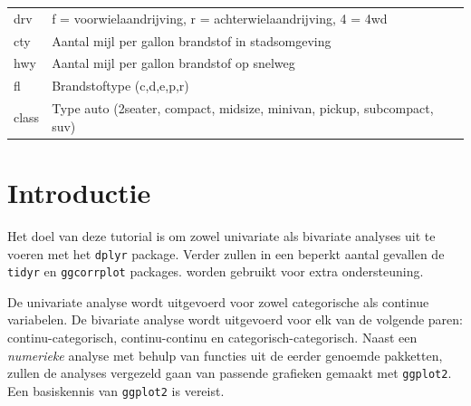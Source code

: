 \documentclass[]{tufte-book}
\begin{document}
\begin{longtable}[]{@{}ll@{}}
\begin{minipage}[t]{0.35\columnwidth}
drv\strut
\end{minipage} & \begin{minipage}[t]{0.59\columnwidth}\raggedright
f = voorwielaandrijving, r = achterwielaandrijving, 4 = 4wd\strut
\end{minipage}\tabularnewline
\begin{minipage}[t]{0.35\columnwidth}\raggedright
cty\strut
\end{minipage} & \begin{minipage}[t]{0.59\columnwidth}\raggedright
Aantal mijl per gallon brandstof in stadsomgeving\strut
\end{minipage}\tabularnewline
\begin{minipage}[t]{0.35\columnwidth}\raggedright
hwy\strut
\end{minipage} & \begin{minipage}[t]{0.59\columnwidth}\raggedright
Aantal mijl per gallon brandstof op snelweg\strut
\end{minipage}\tabularnewline
\begin{minipage}[t]{0.35\columnwidth}\raggedright
fl\strut
\end{minipage} & \begin{minipage}[t]{0.59\columnwidth}\raggedright
Brandstoftype (c,d,e,p,r)\strut
\end{minipage}\tabularnewline
\begin{minipage}[t]{0.35\columnwidth}\raggedright
class\strut
\end{minipage} & \begin{minipage}[t]{0.59\columnwidth}\raggedright
Type auto (2seater, compact, midsize, minivan, pickup, subcompact, suv)\strut
\end{minipage}\tabularnewline
\bottomrule
\end{longtable}

\hypertarget{introductie-1}{%
\section{Introductie}\label{introductie-1}}

Het doel van deze tutorial is om zowel univariate als bivariate analyses uit te voeren met het \texttt{dplyr} package. Verder zullen in een beperkt aantal gevallen de \texttt{tidyr} en \texttt{ggcorrplot} packages. worden gebruikt voor extra ondersteuning.

De univariate analyse wordt uitgevoerd voor zowel categorische als continue variabelen. De bivariate analyse wordt uitgevoerd voor elk van de volgende paren: continu-categorisch, continu-continu en categorisch-categorisch. Naast een \emph{numerieke} analyse met behulp van functies uit de eerder genoemde pakketten, zullen de analyses vergezeld gaan van passende grafieken gemaakt met \texttt{ggplot2}. Een basiskennis van \texttt{ggplot2} is vereist.
\end{document}
